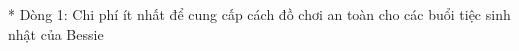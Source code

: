 * Dòng 1: Chi phí ít nhất để cung cấp cách đồ chơi an toàn cho các buổi tiệc sinh nhật của Bessie   

\